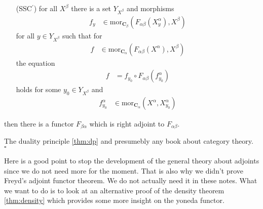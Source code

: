 \begin{thm}[Freyd]
\begin{enumerate}
\begin{enumerate}
\item[(SSC$^\prime$)]
for all $X^{\beta}$ there is a set $Y_{X^{\beta}}$ and morphisms
\begin{align*}
  f_{y}
  &\in
  \mathrm{mor}_{\mathbf{C}_{\beta}}
  \left(
    F_{\alpha\beta}(X_{y}^{\alpha}),
    X^{\beta}
  \right)
\end{align*}
for all $y \in Y_{X^{\beta}}$ such that for
\begin{align*}
  f
  &\in
  \mathrm{mor}_{\mathbf{C}_{\alpha}}
  \left(
    F_{\alpha\beta}(X^{\alpha}),
    X^{\beta}
  \right)
\end{align*}
the equation
\begin{align*}
  f
  &=
  f_{y_{0}}
  \circ
  F_{\alpha\beta}(f_{y_{0}}^{\alpha})
\end{align*}
holds for some $y_{0} \in Y_{X^{\beta}}$ and
\begin{align*}
  f_{y_{0}}^{\alpha}
  &\in
  \mathrm{mor}_{\mathbf{C}_{\alpha}}
  \left(
    X^{\alpha},
    X_{y_{0}}^{\alpha}
  \right)
\end{align*}
\end{enumerate}
then there is a functor $F_{\beta\alpha}$ which is right adjoint to $F_{\alpha\beta}$.
\end{enumerate}
\end{thm}
\begin{prf}
The duality principle \ref{thm:dp} and presumebly any book about category theory.
\\
\phantom{proven}
\hfill
$\square$
\end{prf}
Here is a good point to stop the development of the general theory about adjoints since we do not need more for the moment. That is also why we didn't prove Freyd's adjoint functor theorem. We do not actually need it in these notes. What we want to do is to look at an alternative proof of the density theorem \ref{thm:density} which provides some more insight on the yoneda functor.
